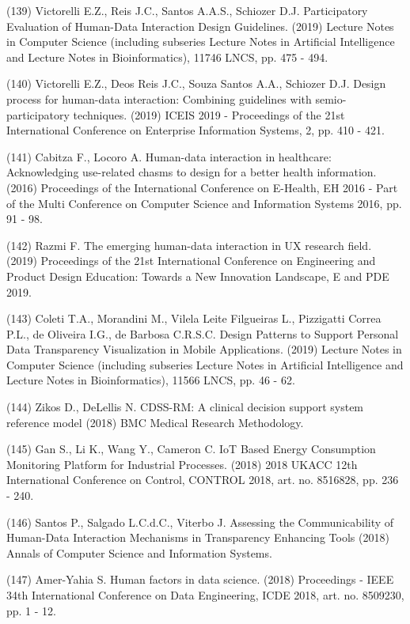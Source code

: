 \documentclass[
	12pt,				%
	oneside,			%
	a4paper,			%
	english,			%
	brazil				%
	]{abntex2ppgsi}
\begin{document}
\begin{apendicesenv}
(139) Victorelli E.Z., Reis J.C., Santos A.A.S., Schiozer D.J. Participatory Evaluation of Human-Data Interaction Design Guidelines. (2019) Lecture Notes in Computer Science (including subseries Lecture Notes in Artificial Intelligence and Lecture Notes in Bioinformatics), 11746 LNCS, pp. 475 - 494.

(140) Victorelli E.Z., Deos Reis J.C., Souza Santos A.A., Schiozer D.J. Design process for human-data interaction: Combining guidelines with semio-participatory techniques. (2019) ICEIS 2019 - Proceedings of the 21st International Conference on Enterprise Information Systems, 2, pp. 410 - 421.

(141) Cabitza F., Locoro A. Human-data interaction in healthcare: Acknowledging use-related chasms to design for a better health information. (2016) Proceedings of the International Conference on E-Health, EH 2016 - Part of the Multi Conference on Computer Science and Information Systems 2016, pp. 91 - 98.

(142) Razmi F. The emerging human-data interaction in UX research field. (2019) Proceedings of the 21st International Conference on Engineering and Product Design Education: Towards a New Innovation Landscape, E and PDE 2019.

(143) Coleti T.A., Morandini M., Vilela Leite Filgueiras L., Pizzigatti Correa P.L., de Oliveira I.G., de Barbosa C.R.S.C. Design Patterns to Support Personal Data Transparency Visualization in Mobile Applications. (2019) Lecture Notes in Computer Science (including subseries Lecture Notes in Artificial Intelligence and Lecture Notes in Bioinformatics), 11566 LNCS, pp. 46 - 62.

(144) Zikos D., DeLellis N. CDSS-RM: A clinical decision support system reference model (2018) BMC Medical Research Methodology.

(145) Gan S., Li K., Wang Y., Cameron C. IoT Based Energy Consumption Monitoring Platform for Industrial Processes. (2018) 2018 UKACC 12th International Conference on Control, CONTROL 2018, art. no. 8516828, pp. 236 - 240.

(146) Santos P., Salgado L.C.d.C., Viterbo J. Assessing the Communicability of Human-Data Interaction Mechanisms in Transparency Enhancing Tools (2018) Annals of Computer Science and Information Systems.

(147) Amer-Yahia S. Human factors in data science. (2018) Proceedings - IEEE 34th International Conference on Data Engineering, ICDE 2018, art. no. 8509230, pp. 1 - 12.


\end{apendicesenv}
\end{document}

